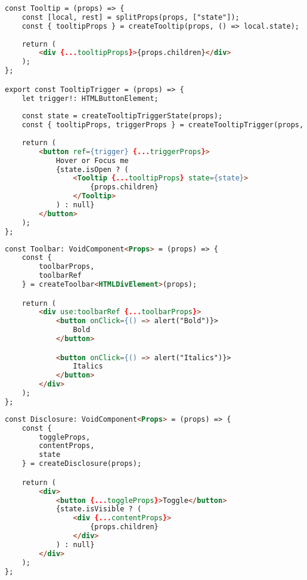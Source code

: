 \begin{lstlisting}[caption={Ukázka použití Tooltipu}, label={tooltip-example}, language=html]
const Tooltip = (props) => {
    const [local, rest] = splitProps(props, ["state"]);
    const { tooltipProps } = createTooltip(props, () => local.state);
    
    return (
        <div {...tooltipProps}>{props.children}</div>
    );
};

export const TooltipTrigger = (props) => {
    let trigger!: HTMLButtonElement;
    
    const state = createTooltipTriggerState(props);
    const { tooltipProps, triggerProps } = createTooltipTrigger(props, state, () => trigger);
    
    return (
        <button ref={trigger} {...triggerProps}>
            Hover or Focus me
            {state.isOpen ? (
                <Tooltip {...tooltipProps} state={state}>
                    {props.children}
                </Tooltip>
            ) : null}
        </button>
    );
};

\end{lstlisting}

\clearpage

\begin{lstlisting}[caption={Ukázka použití createToolbar funkce}, label={toolbar-example}, language=html]
const Toolbar: VoidComponent<Props> = (props) => {
    const {
        toolbarProps,
        toolbarRef
    } = createToolbar<HTMLDivElement>(props);

    return (
        <div use:toolbarRef {...toolbarProps}>
            <button onClick={() => alert("Bold")}>
                Bold
            </button>

            <button onClick={() => alert("Italics")}>
                Italics
            </button>
        </div>
    );
};
\end{lstlisting}

\begin{lstlisting}[caption={Ukázka použití createDisclosure funkce}, label={disclosure-example}, language=html]
const Disclosure: VoidComponent<Props> = (props) => {
    const {
        toggleProps,
        contentProps,
        state
    } = createDisclosure(props);

    return (
        <div>
            <button {...toggleProps}>Toggle</button>
            {state.isVisible ? (
                <div {...contentProps}>
                    {props.children}
                </div>
            ) : null}
        </div>
    );
};
\end{lstlisting}


